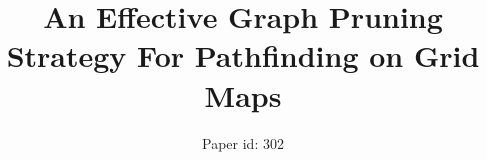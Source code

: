 \documentclass{article}
\begin{document}
\title{An Effective Graph Pruning Strategy For Pathfinding on Grid Maps}
\author{
Paper id: 302
}

\maketitle









%



\end{document}
